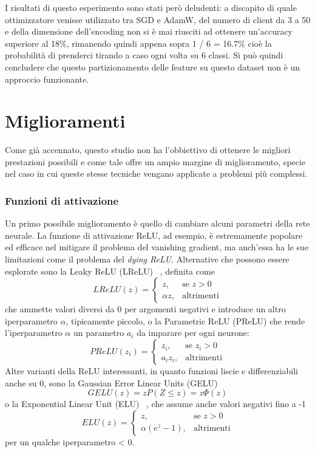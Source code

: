 I risultati di questo esperimento sono stati però deludenti: a discapito
di quale ottimizzatore venisse utilizzato tra SGD e AdamW, del numero di client da 
3 a 50 e della dimensione dell'encoding non si è mai riusciti ad ottenere 
un'accuracy superiore al 18\%, rimanendo quindi appena sopra
1 / 6 = 16.7\% cioè la probabilità di prenderci tirando a caso ogni 
volta su 6 classi. Si può quindi concludere che questo partizionamento
delle feature su questo dataset non è un approccio funzionante.


\section{Miglioramenti}
Come già accennato, questo studio non ha l'obbiettivo di ottenere le 
migliori prestazioni possibili e come tale offre un ampio margine di 
miglioramento, specie nel caso in cui queste stesse tecniche vengano 
applicate a problemi più complessi.  


\subsubsection{Funzioni di attivazione}
Un primo possibile miglioramento 
è quello di cambiare alcuni parametri 
della rete neurale.
La funzione di attivazione ReLU, ad esempio, è 
estremamente popolare ed efficace nel mitigare il problema del 
vanishing gradient, ma anch'essa ha le sue limitazioni come il 
problema del \textit{dying ReLU}. Alternative che possono essere 
esplorate sono la Leaky ReLU (LReLU) ~\cite{Maas2013RectifierNI},
definita come
\[
LReLU(z) = 
\begin{cases} 
      z, & \text{se } z > 0 \\
      \alpha z, & \text{altrimenti}
\end{cases}
\]
che ammette valori diversi da 0 per argomenti negativi e introduce un 
altro iperparametro \(\alpha\), tipicamente piccolo,
o la Parametric ReLU (PReLU) che rende l'iperparametro \(\alpha\)
un parametro \(a_i\) da imparare per ogni neurone:
\[
PReLU(z_i) = 
\begin{cases} 
      z_i, & \text{se } z_i > 0 \\
      a_i z_i, & \text{altrimenti}
\end{cases}
\]
Altre varianti della ReLU interessanti, in quanto funzioni liscie e 
differenziabili anche su 0, sono la Gaussian Error Linear Units (GELU)
~\cite{hendrycks2016gelu}
\[
GELU(z) = z P(Z \le z) = z \Phi(z)
\]
o la Exponential Linear Unit (ELU) ~\cite{clevert2016elu}, 
che assume anche valori negativi fino a -1
\[
ELU(z) = 
\begin{cases} 
      z, & \text{se } z > 0 \\
      \alpha (e^z - 1), & \text{altrimenti}
\end{cases}
\]
per un qualche iperparametro \alpha < 0.


